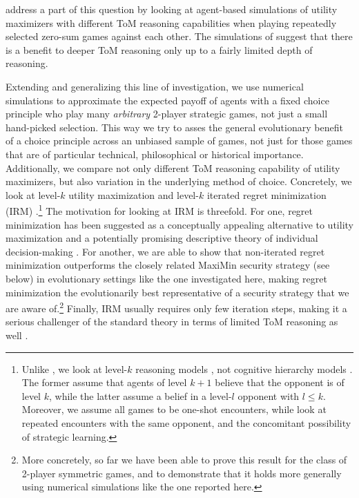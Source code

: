 \documentclass{llncs}
\begin{document}
\citet{Weerdde-WeerdVerbrugge2013:How-much-does-i} address a part of
this question by looking at agent-based simulations of utility
maximizers with different ToM reasoning capabilities when playing
repeatedly selected zero-sum games against each other. The simulations
of \citeauthor{Weerdde-WeerdVerbrugge2013:How-much-does-i} suggest
that there is a benefit to deeper ToM reasoning only up to a fairly
limited depth of reasoning. 

Extending and generalizing this line of investigation, we use
numerical simulations to approximate the expected payoff of agents
with a fixed choice principle who play many \emph{arbitrary} 2-player
strategic games, not just a small hand-picked selection. This way we
try to asses the general evolutionary benefit of a choice principle
across an unbiased sample of games, not just for those games that are
of particular technical, philosophical or historical
importance. Additionally, we compare not only different ToM reasoning
capability of utility maximizers, but also variation in the underlying
method of choice. Concretely, we look at level-$k$ utility
maximization and level-$k$ iterated regret minimization (IRM)
\citep{HalpernPass2012:Iterated-Regret}.\footnote{Unlike
  \citeauthor{Weerdde-WeerdVerbrugge2013:How-much-does-i}, we look at
  level-$k$ reasoning models
  \citep[e.g.][]{Crawford2003:Lying-for-Strat,Crawford2007:Lets-Talk-It-Ove},
  not cognitive hierarchy models
  \citep[e.g.][]{CamererHo2004:A-Cognitive-Hie}. The former assume
  that agents of level $k+1$ believe that the opponent is of level
  $k$, while the latter assume a belief in a level-$l$ opponent with
  $l \le k$. Moreover, we assume all games to be one-shot encounters,
  while \citeauthor{Weerdde-WeerdVerbrugge2013:How-much-does-i} look
  at repeated encounters with the same opponent, and the concomitant
  possibility of strategic learning.}  The motivation for looking at
IRM is threefold. For one, regret minimization has been suggested as a
conceptually appealing alternative to utility maximization and a
potentially promising descriptive theory of individual decision-making
\citep{LoomesSugden1982:Regret-Theory:-}. For another, we are able to
show that non-iterated regret minimization outperforms the closely
related MaxiMin security strategy (see below) in evolutionary settings
like the one investigated here, making regret minimization the
evolutionarily best representative of a security strategy that we are
aware of.\footnote{More concretely, so far we have been able to prove
  this result for the class of 2-player symmetric games, and to
  demonstrate that it holds more generally using numerical simulations
  like the one reported here.} Finally, IRM usually requires only few
iteration steps, making it a serious challenger of the standard theory
in terms of limited ToM reasoning as well
\citep[c.f.][]{HalpernPass2012:Iterated-Regret}.
\end{document}
